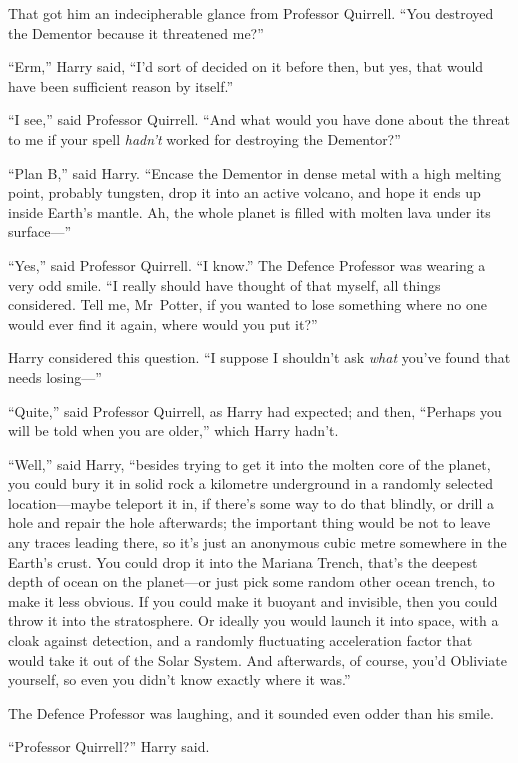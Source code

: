 That got him an indecipherable glance from Professor Quirrell. “You destroyed the Dementor because it threatened me?”

“Erm,” Harry said, “I’d sort of decided on it before then, but yes, that would have been sufficient reason by itself.”

“I see,” said Professor Quirrell. “And what would you have done about the threat to me if your spell \emph{hadn’t} worked for destroying the Dementor?”

“Plan B,” said Harry. “Encase the Dementor in dense metal with a high melting point, probably tungsten, drop it into an active volcano, and hope it ends up inside Earth’s mantle. Ah, the whole planet is filled with molten lava under its surface—”

“Yes,” said Professor Quirrell. “I know.” The Defence Professor was wearing a very odd smile. “I really should have thought of that myself, all things considered. Tell me, Mr~Potter, if you wanted to lose something where no one would ever find it again, where would you put it?”

Harry considered this question. “I suppose I shouldn’t ask \emph{what} you’ve found that needs losing—”

“Quite,” said Professor Quirrell, as Harry had expected; and then, “Perhaps you will be told when you are older,” which Harry hadn’t.

“Well,” said Harry, “besides trying to get it into the molten core of the planet, you could bury it in solid rock a kilometre underground in a randomly selected location—maybe teleport it in, if there’s some way to do that blindly, or drill a hole and repair the hole afterwards; the important thing would be not to leave any traces leading there, so it’s just an anonymous cubic metre somewhere in the Earth’s crust. You could drop it into the Mariana Trench, that’s the deepest depth of ocean on the planet—or just pick some random other ocean trench, to make it less obvious. If you could make it buoyant and invisible, then you could throw it into the stratosphere. Or ideally you would launch it into space, with a cloak against detection, and a randomly fluctuating acceleration factor that would take it out of the Solar System. And afterwards, of course, you’d Obliviate yourself, so even you didn’t know exactly where it was.”

The Defence Professor was laughing, and it sounded even odder than his smile.

“Professor Quirrell?” Harry said.

